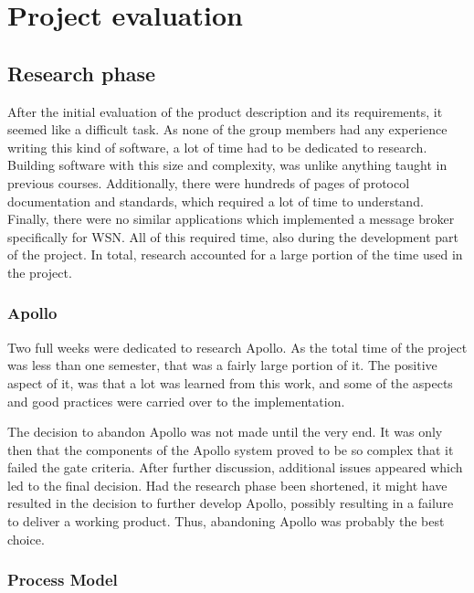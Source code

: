 
\chapter{Project evaluation}
\label{ch:project_evaluation}

\section{Research phase}
\label{sec:project_evaluation-research_phase}


After the initial evaluation of the product description and its requirements, it seemed like a difficult task. As none of the group members had any experience writing this kind of software, a lot of time had to be dedicated to research. Building software with this size and complexity, was unlike anything taught in previous courses. Additionally, there were hundreds of pages of protocol documentation and standards, which required a lot of time to understand. Finally, there were no similar applications which implemented a message broker specifically for WSN. All of this required time, also during the development part of the project. In total, research accounted for a large portion of the time used in the project.

\subsection{Apollo}
\label{subsec:project_evaluation-research_phase-apollo}

Two full weeks were dedicated to research Apollo. As the total time of the project was less than one semester, that was a fairly large portion of it. The positive aspect of it, was that a lot was learned from this work, and some of the aspects and good practices were carried over to the implementation.

The decision to abandon Apollo was not made until the very end. It was only then that the components of the Apollo system proved to be so complex that it failed the gate criteria. After further discussion, additional issues appeared which led to the final decision. Had the research phase been shortened, it might have resulted in the decision to further develop Apollo, possibly resulting in a failure to deliver a working product. Thus, abandoning Apollo was probably the best choice.

\subsection{Process Model}
\label{subsec:project_evaluation-research_phase-process_model}

